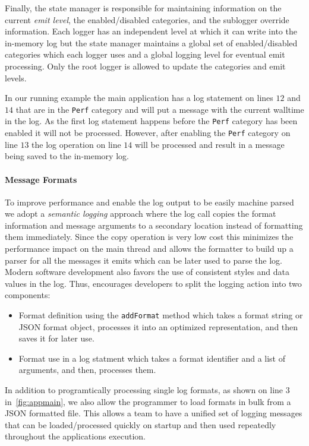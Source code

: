 Finally, the state manager is responsible for maintaining information on the current 
\emph{emit level}, the enabled/disabled categories, and the sublogger override information. 
Each logger has an independent level at which it can write into the in-memory log but 
the state manager maintains a global set of enabled/disabled categories which each logger 
uses and a global logging level for eventual emit processing. Only the root logger is 
allowed to update the categories and emit levels. 

In our running example the main application has a log statement on lines $12$ and $14$ 
that are in the \texttt{Perf} category and will put a message with the current walltime 
in the log. As the first log statement happens before the \texttt{Perf} category has 
been enabled it will not be processed. However, after enabling the \texttt{Perf} category 
on line $13$ the log operation on line $14$ will be processed and result in a message 
being saved to the in-memory log.

\paragraph{Message Formats}
\noindent
To improve performance and enable the log output to be easily machine parsed we 
adopt a \emph{semantic logging} approach where the log call copies the format 
information and message arguments to a secondary location instead of formatting them 
immediately. Since the copy operation is very low cost this minimizes the 
performance impact on the main thread and allows the formatter to build up a 
parser for all the messages it emits which can be later used to parse the log. 
Modern software development also favors the use of consistent styles and data 
values in the log. Thus, \projn encourages developers to split the logging 
action into two components:
\begin{itemize}
\item Format definition using the \texttt{addFormat} method which takes a format 
string or JSON format object, processes it into an optimized representation, 
and then saves it for later use.
\item Format use in a log statment which takes a format identifier and a list of 
arguments, and then, processes them.
\end{itemize}

In addition to programtically processing single log formats, as shown on line 3 
in~\autoref{fig:appmain}, we also allow the programmer to load formats in bulk 
from a JSON formatted file. This allows a team to have a unified set of logging 
messages that can be loaded/processed quickly on startup and then used repeatedly 
throughout the applications execution. 

